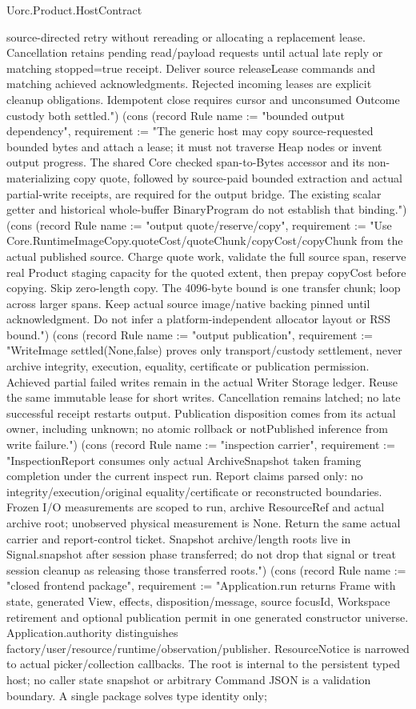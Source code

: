 \begin{lexlean}{Uorc.Product.HostContract}
\begin{semanticmodule}
{source-directed retry without rereading or allocating a replacement lease. Cancellation retains pending read/payload requests until actual late reply or matching stopped=true receipt. Deliver source releaseLease commands and matching achieved acknowledgments. Rejected incoming leases are explicit cleanup obligations. Idempotent close requires cursor and unconsumed Outcome custody both settled."}) (cons (record Rule {name := "bounded output dependency", requirement := "The generic host may copy source-requested bounded bytes and attach a lease; it must not traverse Heap nodes or invent output progress. The shared Core checked span-to-Bytes accessor and its non-materializing copy quote, followed by source-paid bounded extraction and actual partial-write receipts, are required for the output bridge. The existing scalar getter and historical whole-buffer BinaryProgram do not establish that binding."}) (cons (record Rule {name := "output quote/reserve/copy", requirement := "Use Core.RuntimeImageCopy.quoteCost/quoteChunk/copyCost/copyChunk from the actual published source. Charge quote work, validate the full source span, reserve real Product staging capacity for the quoted extent, then prepay copyCost before copying. Skip zero-length copy. The 4096-byte bound is one transfer chunk; loop across larger spans. Keep actual source image/native backing pinned until acknowledgment. Do not infer a platform-independent allocator layout or RSS bound."}) (cons (record Rule {name := "output publication", requirement := "WriteImage settled(None,false) proves only transport/custody settlement, never archive integrity, execution, equality, certificate or publication permission. Achieved partial failed writes remain in the actual Writer Storage ledger. Reuse the same immutable lease for short writes. Cancellation remains latched; no late successful receipt restarts output. Publication disposition comes from its actual owner, including unknown; no atomic rollback or notPublished inference from write failure."}) (cons (record Rule {name := "inspection carrier", requirement := "InspectionReport consumes only actual ArchiveSnapshot taken framing completion under the current inspect run. Report claims parsed only: no integrity/execution/original equality/certificate or reconstructed boundaries. Frozen I/O measurements are scoped to run, archive ResourceRef and actual archive root; unobserved physical measurement is None. Return the same actual carrier and report-control ticket. Snapshot archive/length roots live in Signal.snapshot after session phase transferred; do not drop that signal or treat session cleanup as releasing those transferred roots."}) (cons (record Rule {name := "closed frontend package", requirement := "Application.run returns Frame with state, generated View, effects, disposition/message, source focusId, Workspace retirement and optional publication permit in one generated constructor universe. Application.authority distinguishes factory/user/resource/runtime/observation/publisher. ResourceNotice is narrowed to actual picker/collection callbacks. The root is internal to the persistent typed host; no caller state snapshot or arbitrary Command JSON is a validation boundary. A single package solves type identity only; }
\end{semanticmodule}
\end{lexlean}
